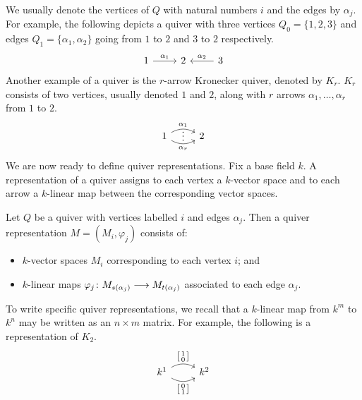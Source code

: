 \documentclass[a4paper]{amsart}
\begin{document}
We usually denote the vertices of $Q$ with natural numbers $i$ and the edges by $\alpha_j$. For example, the following depicts a quiver with three vertices $Q_0=\{1,2,3\}$ and edges $Q_1=\{\alpha_1,\alpha_2\}$ going from $1$ to $2$ and $3$ to $2$ respectively.
\[
    \begin{tikzcd}
        1 \arrow[r, "\alpha_1"] & 2 & 3 \arrow[l,swap, "\alpha_2"]
    \end{tikzcd}
\]
Another example of a quiver is the $r$-arrow Kronecker quiver, denoted by $K_r$. $K_r$ consists of two vertices, usually denoted $1$ and $2$, along with $r$ arrows $\alpha_1,\dots,\alpha_r$ from $1$ to $2$.
\[
    \begin{tikzcd}
        1
            \arrow[r, draw=none, "\raisebox{+1.5ex}{\vdots}" description]
            \arrow[r, bend left,        "\alpha_1"]
            \arrow[r, bend right, swap, "\alpha_r"]
        &  2
    \end{tikzcd}
\]
We are now ready to define quiver representations. Fix a base field $k$. A representation of a quiver assigns to each vertex a $k$-vector space and to each arrow a $k$-linear map between the corresponding vector spaces.
\begin{Definition}
    Let $Q$ be a quiver with vertices labelled $i$ and edges $\alpha_j$. Then a quiver representation $M = (M_i, \varphi_j)$ consists of:
    \begin{itemize}
        \item $k$-vector spaces $M_i$ corresponding to each vertex $i$; and
        \item $k$-linear maps $\varphi_j\colon M_{s(\alpha_j)}\longrightarrow M_{t(\alpha_j)}$ associated to each edge $\alpha_j$.
    \end{itemize}
\end{Definition}
To write specific quiver representations, we recall that a $k$-linear map from $k^m$ to $k^n$ may be written as an $n\times m$ matrix. For example, the following is a representation of $K_2$.
\[
    \begin{tikzcd}
        k^1
            \arrow[r, bend left,        "\sbmqty{1\\0}"]
            \arrow[r, bend right, swap, "\sbmqty{0\\1}"]
        &  k^2
    \end{tikzcd}
\]
\end{document}
